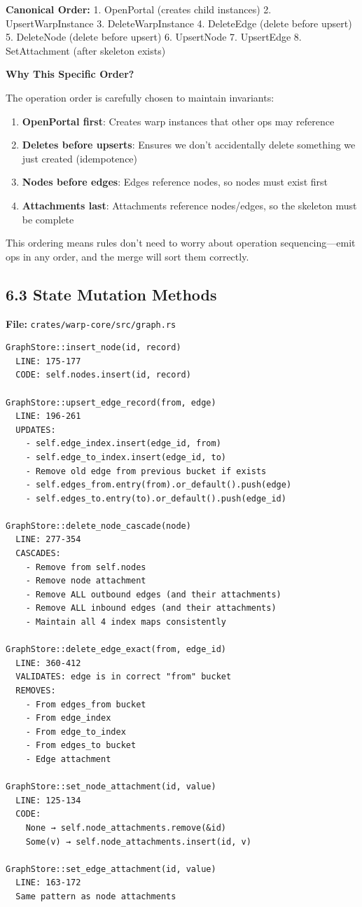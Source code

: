 \documentclass[11pt]{book}
\begin{document}
\textbf{Canonical Order:} 1. OpenPortal (creates child instances) 2.
UpsertWarpInstance 3. DeleteWarpInstance 4. DeleteEdge (delete before
upsert) 5. DeleteNode (delete before upsert) 6. UpsertNode 7. UpsertEdge
8. SetAttachment (after skeleton exists)

\begin{deepdive}
\textbf{Why This Specific Order?}

The operation order is carefully chosen to maintain invariants:

\begin{enumerate}
\item \textbf{OpenPortal first}: Creates warp instances that other ops may reference
\item \textbf{Deletes before upserts}: Ensures we don't accidentally delete something we just created (idempotence)
\item \textbf{Nodes before edges}: Edges reference nodes, so nodes must exist first
\item \textbf{Attachments last}: Attachments reference nodes/edges, so the skeleton must be complete
\end{enumerate}

This ordering means rules don't need to worry about operation sequencing---emit ops in any order, and the merge will sort them correctly.
\end{deepdive}

\subsection{6.3 State Mutation Methods}\label{state-mutation-methods}

\textbf{File:} \texttt{crates/warp-core/src/graph.rs}

\begin{verbatim}
GraphStore::insert_node(id, record)
  LINE: 175-177
  CODE: self.nodes.insert(id, record)

GraphStore::upsert_edge_record(from, edge)
  LINE: 196-261
  UPDATES:
    - self.edge_index.insert(edge_id, from)
    - self.edge_to_index.insert(edge_id, to)
    - Remove old edge from previous bucket if exists
    - self.edges_from.entry(from).or_default().push(edge)
    - self.edges_to.entry(to).or_default().push(edge_id)

GraphStore::delete_node_cascade(node)
  LINE: 277-354
  CASCADES:
    - Remove from self.nodes
    - Remove node attachment
    - Remove ALL outbound edges (and their attachments)
    - Remove ALL inbound edges (and their attachments)
    - Maintain all 4 index maps consistently

GraphStore::delete_edge_exact(from, edge_id)
  LINE: 360-412
  VALIDATES: edge is in correct "from" bucket
  REMOVES:
    - From edges_from bucket
    - From edge_index
    - From edge_to_index
    - From edges_to bucket
    - Edge attachment

GraphStore::set_node_attachment(id, value)
  LINE: 125-134
  CODE:
    None → self.node_attachments.remove(&id)
    Some(v) → self.node_attachments.insert(id, v)

GraphStore::set_edge_attachment(id, value)
  LINE: 163-172
  Same pattern as node attachments
\end{verbatim}
\end{document}
